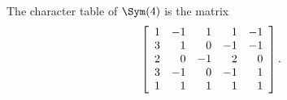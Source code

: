The character table of $\Sym(4)$ is the matrix
$$
\left[
\begin{array}{*{5}r}
1  & -1  & 1  & 1  & -1\\
3  & 1  & 0  & -1  & -1\\
2  & 0  & -1  & 2  & 0\\
3  & -1  & 0  & -1  & 1\\
1  & 1  & 1  & 1  & 1\\
\end{array}
\right].
$$
